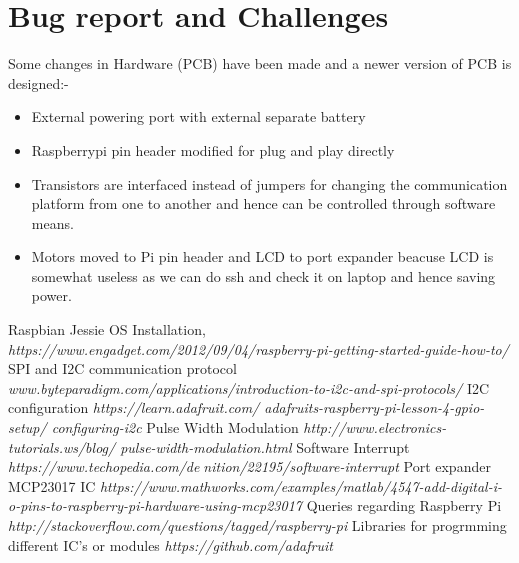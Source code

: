 \documentclass[a4paper,12pt,oneside]{book}
\begin{document}
	\section{Bug report and Challenges}
	Some changes in Hardware (PCB) have been made and a newer version of PCB is designed:-
	\begin{itemize}
		\item External powering port with external separate battery
		\item Raspberrypi pin header modified for plug and play directly
		\item Transistors are interfaced instead of jumpers for changing the communication platform from one to another and hence can be controlled through software means.
		\item Motors moved to Pi pin header and LCD to port expander beacuse LCD is somewhat useless as we can do ssh and check it on laptop and hence saving power.
	\end{itemize}
	
	\begin{thebibliography}{li}
		Raspbian Jessie OS Installation,
		{\em https://www.engadget.com/2012/09/04/raspberry-pi-getting-started-guide-how-to/}
		SPI and I2C communication protocol
		{\em www.byteparadigm.com/applications/introduction-to-i2c-and-spi-protocols/}
		I2C configuration
		{\em https://learn.adafruit.com/
			adafruits-raspberry-pi-lesson-4-gpio-setup/
			configuring-i2c}
		Pulse Width Modulation
		{\em http://www.electronics-tutorials.ws/blog/
			pulse-width-modulation.html}
		Software Interrupt
		{\em https://www.techopedia.com/denition/22195/software-interrupt}
		Port expander MCP23017 IC
		{\em https://www.mathworks.com/examples/matlab/4547-add-digital-i-o-pins-to-raspberry-pi-hardware-using-mcp23017}
		Queries regarding Raspberry Pi
		{\em http://stackoverflow.com/questions/tagged/raspberry-pi}
		Libraries for progrmming different IC's or modules
		{\em https://github.com/adafruit}
	\end{thebibliography}
	
\end{document}
